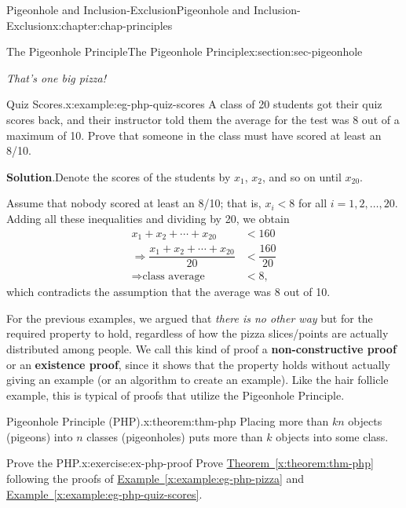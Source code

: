 \documentclass[oneside,10pt,]{book}
\newcommand{\blocktitlefont}{\relax}
\newcommand{\xreffont}{\relax}
\newcommand{\terminology}[1]{\textbf{#1}}
\numberwithin{equation}{section}
\newcommand{\lt}{<}
\newcommand{\amp}{&}
\begin{document}
\begin{chapterptx}{Pigeonhole and Inclusion-Exclusion}{}{Pigeonhole and Inclusion-Exclusion}{}{}{x:chapter:chap-principles}
\begin{sectionptx}{The Pigeonhole Principle}{}{The Pigeonhole Principle}{}{}{x:section:sec-pigeonhole}
\begin{sidebyside}{1}{0.325}{0.325}{0}
\end{sidebyside}%
\begin{sidebyside}{1}{0.365}{0.365}{0}%
\begin{sbspanel}{0.27}%
\emph{That's one big pizza!}%
\end{sbspanel}%
\end{sidebyside}%
\begin{example}{Quiz Scores.}{x:example:eg-php-quiz-scores}%
A class of 20 students got their quiz scores back, and their instructor told them the average for the test was 8 out of a maximum of 10. Prove that someone in the class must have scored at least an 8\slash{}10.%
\par\smallskip%
\noindent\textbf{\blocktitlefont Solution}.\hypertarget{g:solution:id445374}{}\quad{}Denote the scores of the students by \(x_1\), \(x_2\), and so on until \(x_{20}\).%
\par
Assume that nobody scored at least an 8\slash{}10; that is, \(x_i \lt 8\) for all \(i = 1,2,\ldots, 20\). Adding all these inequalities and dividing by 20, we obtain%
\begin{align*}
x_1 + x_2 + \cdots + x_{20} \amp \lt 160\\
\Rightarrow \dfrac{x_1+x_2+\cdots+x_{20}}{20} \amp \lt \dfrac{160}{20}\\
\Rightarrow \text{class average } \amp \lt 8\text{,}
\end{align*}
which contradicts the assumption that the average was 8 out of 10.%
\end{example}
For the previous examples, we argued that \emph{there is no other way} but for the required property to hold, regardless of how the pizza slices\slash{}points are actually distributed among people. We call this kind of proof a \terminology{non-constructive proof} or an \terminology{existence proof}, since it shows that the property holds without actually giving an example (or an algorithm to create an example). Like the hair follicle example, this is typical of proofs that utilize the Pigeonhole Principle.%
\begin{theorem}{Pigeonhole Principle (PHP).}{}{x:theorem:thm-php}%
Placing more than \(kn\) objects (pigeons) into \(n\) classes (pigeonholes) puts more than \(k\) objects into some class.%
\end{theorem}
\begin{inlineexercise}{Prove the PHP.}{x:exercise:ex-php-proof}%
Prove \hyperref[x:theorem:thm-php]{Theorem~{\xreffont\ref{x:theorem:thm-php}}} following the proofs of \hyperref[x:example:eg-php-pizza]{Example~{\xreffont\ref{x:example:eg-php-pizza}}} and \hyperref[x:example:eg-php-quiz-scores]{Example~{\xreffont\ref{x:example:eg-php-quiz-scores}}}.%

\end{inlineexercise}
\end{sectionptx}
\end{chapterptx}
\end{document}
